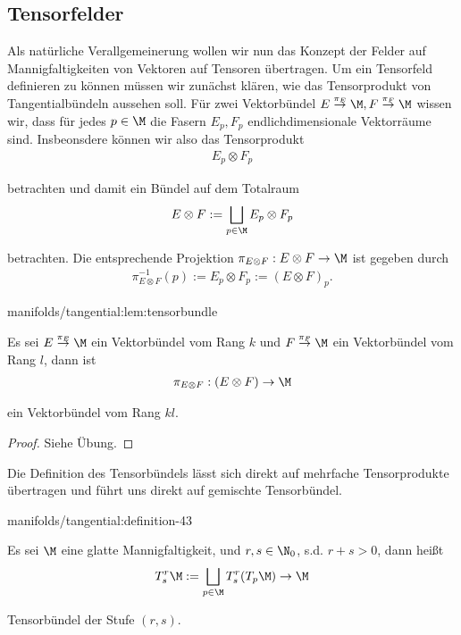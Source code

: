\documentclass[letterpaper,10pt,german]{jupyterBook}
\begin{document}
\subsection{Tensorfelder}
\label{\detokenize{manifolds/tangential:tensorfelder}}
\par
Als natürliche Verallgemeinerung wollen wir nun das Konzept der Felder auf Mannigfaltigkeiten von Vektoren auf Tensoren übertragen. Um ein Tensorfeld definieren zu können müssen wir zunächst klären, wie das Tensorprodukt von Tangentialbündeln aussehen soll. Für zwei Vektorbündel \(E\overset{\pi_E}{\to}{\M}, F\overset{\pi_F}{\to}{\M}\) wissen wir, dass für jedes \(p\in\M\) die Fasern \(E_p, F_p\) endlichdimensionale Vektorräume sind. Insbeonsdere können wir also das Tensorprodukt
\begin{align*}
E_p\otimes F_p
\end{align*}
\par
betrachten und damit ein Bündel auf dem Totalraum
\begin{align*}
E\otimes F:= \bigsqcup_{p\in\M} E_p\otimes F_p
\end{align*}
\par
betrachten. Die entsprechende Projektion \(\pi_{E\otimes F}:E\otimes F\to\M\) ist gegeben durch
\begin{align*}
\pi_{E\otimes F}^{-1}(p):= E_p\otimes F_p := (E\otimes F)_p.
\end{align*}\begin{lemma}{}{manifolds/tangential:lem:tensorbundle}



\par
Es sei \(E\overset{\pi_E}{\to}{\M}\) ein Vektorbündel vom Rang \(k\) und \(F\overset{\pi_F}{\to}{\M}\) ein Vektorbündel vom Rang \(l\), dann ist
\begin{align*}
\pi_{E\otimes F}:(E\otimes F)\to \M
\end{align*}
\par
ein Vektorbündel vom Rang \(kl\).
\end{lemma}

\begin{proof}
 Siehe Übung.
\end{proof}

\par
Die Definition des Tensorbündels lässt sich direkt auf mehrfache Tensorprodukte übertragen und führt uns direkt auf gemischte Tensorbündel.
\begin{definition}{}{manifolds/tangential:definition-43}



\par
Es sei \(\M\) eine glatte Mannigfaltigkeit, und \(r,s\in\N_0\), s.d. \(r+s>0\), dann heißt
\begin{align*}
T^r_s\M := \bigsqcup_{p\in\M} T^r_s(T_p\M) \to \M
\end{align*}
\par
Tensorbündel der Stufe \((r,s)\).
\end{definition}
\end{document}
